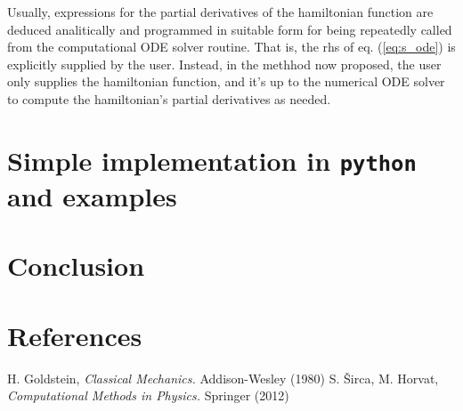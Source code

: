 \documentclass{iopart}
\begin{document}
Usually, expressions for the partial derivatives of the hamiltonian function are
deduced analitically and programmed in suitable form for being repeatedly called
from the computational ODE solver routine. That is, the rhs of eq.
(\ref{eq:s_ode}) is explicitly supplied by the user. Instead, in the methhod now
proposed, the user only supplies the hamiltonian function, and it's up to the
numerical ODE solver to compute the hamiltonian's partial derivatives as needed.

\section{Simple implementation in \texttt{python} and examples}
\section{Conclusion}

\section*{References}
\begin{thebibliography}{99}
   H. Goldstein, \textsl{Classical Mechanics.} Addison-Wesley
  (1980)
   S. \v{S}irca, M. Horvat, \textsl{Computational Methods in
  Physics.} Springer (2012)
\end{thebibliography}
\end{document}
